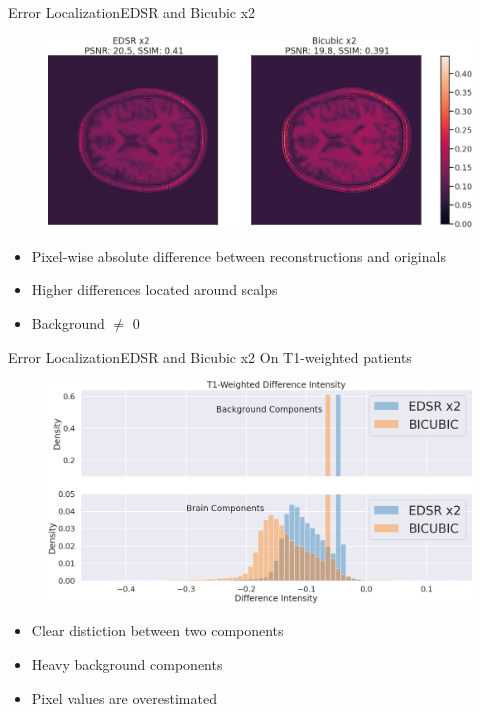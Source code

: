 \documentclass[10pt, unicode]{beamer}
\begin{document}
\begin{frame}{Error Localization}{EDSR and Bicubic x2}

  \begin{figure}
    \centering
    \includegraphics[scale=0.2]{./images/diff-edsr.png}
  \end{figure}
  
  \begin{itemize}
   \item Pixel-wise absolute difference between reconstructions and originals
   \item Higher differences located around scalps
   \item Background $\neq$ 0
  \end{itemize}


\end{frame}

\begin{frame}{Error Localization}{EDSR and Bicubic x2 On T1-weighted patients }

  \begin{figure}
    \includegraphics[scale=0.2]{./images/EDSR_diff_histo_t1.png}
  \end{figure}
  
  \begin{itemize}
    \item Clear distiction between two components
    \item Heavy background components
    \item Pixel values are  overestimated
  \end{itemize}

\end{frame}
\end{document}
